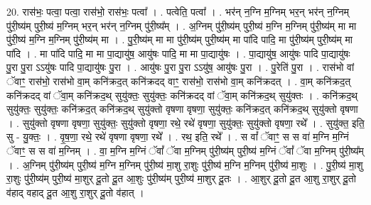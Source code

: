 \documentclass[17pt]{extarticle}
\begin{document}
20. रास॑भः॒ पत्वा॒ पत्वा॒ रास॑भो॒ रास॑भः॒ पत्वा᳚ । . पत्वेति॒ पत्वा᳚ । . भर॑न् न॒ग्नि म॒ग्निम् भर॒न् भर॑न् न॒ग्निम् पु॑री॒ष्य॑म् पुरी॒ष्य॑ म॒ग्निम् भर॒न् भर॑न् न॒ग्निम् पु॑री॒ष्य᳚म् । . अ॒ग्निम् पु॑री॒ष्य॑म् पुरी॒ष्य॑ म॒ग्नि म॒ग्निम् पु॑री॒ष्य॑म् मा मा पु॑री॒ष्य॑ म॒ग्नि म॒ग्निम् पु॑री॒ष्य॑म् मा । . पु॒री॒ष्य॑म् मा मा पु॑री॒ष्य॑म् पुरी॒ष्य॑म् मा पा॑दि पादि॒ मा पु॑री॒ष्य॑म् पुरी॒ष्य॑म् मा पा॑दि । . मा पा॑दि पादि॒ मा मा पा॒द्यायु॑ष॒ आयु॑षः पादि॒ मा मा पा॒द्यायु॑षः । . पा॒द्यायु॑ष॒ आयु॑षः पादि पा॒द्यायु॑षः पु॒रा पु॒रा ऽऽयु॑षः पादि पा॒द्यायु॑षः पु॒रा । . आयु॑षः पु॒रा पु॒रा ऽऽयु॑ष॒ आयु॑षः पु॒रा । . पु॒रेति॑ पु॒रा । . रास॑भो वां ॅवाꣳ॒॒ रास॑भो॒ रास॑भो वा॒म् कनि॑क्रद॒त् कनि॑क्रदद् वाꣳ॒॒ रास॑भो॒ रास॑भो वा॒म् कनि॑क्रदत् । . वा॒म् कनि॑क्रद॒त् कनि॑क्रदद् वां ॅवा॒म् कनि॑क्रद॒थ् सुयु॑क्तः॒ सुयु॑क्तः॒ कनि॑क्रदद् वां ॅवा॒म् कनि॑क्रद॒थ् सुयु॑क्तः । . कनि॑क्रद॒थ् सुयु॑क्तः॒ सुयु॑क्तः॒ कनि॑क्रद॒त् कनि॑क्रद॒थ् सुयु॑क्तो वृषणा वृषणा॒ सुयु॑क्तः॒ कनि॑क्रद॒त् कनि॑क्रद॒थ् सुयु॑क्तो वृषणा । . सुयु॑क्तो वृषणा वृषणा॒ सुयु॑क्तः॒ सुयु॑क्तो वृषणा॒ रथे॒ रथे॑ वृषणा॒ सुयु॑क्तः॒ सुयु॑क्तो वृषणा॒ रथे᳚ । . सुयु॑क्त॒ इति॒ सु - यु॒क्तः॒ । . वृ॒ष॒णा॒ रथे॒ रथे॑ वृषणा वृषणा॒ रथे᳚ । . रथ॒ इति॒ रथे᳚ । . स वां᳚ ॅवाꣳ॒॒ स स वा॑ म॒ग्नि म॒ग्निं ॅवाꣳ॒॒ स स वा॑ म॒ग्निम् । . वा॒ म॒ग्नि म॒ग्निं ॅवां᳚ ॅवा म॒ग्निम् पु॑री॒ष्य॑म् पुरी॒ष्य॑ म॒ग्निं ॅवां᳚ ॅवा म॒ग्निम् पु॑री॒ष्य᳚म् । . अ॒ग्निम् पु॑री॒ष्य॑म् पुरी॒ष्य॑ म॒ग्नि म॒ग्निम् पु॑री॒ष्य॑ मा॒शु रा॒शुः पु॑री॒ष्य॑ म॒ग्नि म॒ग्निम् पु॑री॒ष्य॑ मा॒शुः । . पु॒री॒ष्य॑ मा॒शु रा॒शुः पु॑री॒ष्य॑म् पुरी॒ष्य॑ मा॒शुर् दू॒तो दू॒त आ॒शुः पु॑री॒ष्य॑म् पुरी॒ष्य॑ मा॒शुर् दू॒तः । . आ॒शुर् दू॒तो दू॒त आ॒शु रा॒शुर् दू॒तो व॑हाद् वहाद् दू॒त आ॒शु रा॒शुर् दू॒तो व॑हात् । \newline
\end{document}
